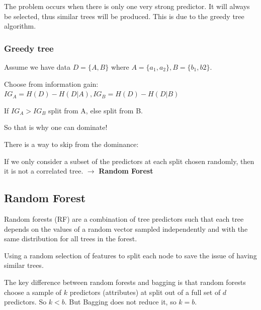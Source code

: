 \documentclass[letterpaper,12pt]{article}
\begin{document}
The problem occurs when there is only one very strong predictor. It will always be selected, thus similar trees will be produced. This is due to the greedy tree algorithm. 

\subsubsection{Greedy tree}
Assume we have data $D=\{A,B\}$ where $A=\{a_1,a_2\},B=\{b_1,b2\}$.

Choose from information gain: $IG_A = H(D)-H(D|A), IG_B=H(D)-H(D|B)$

If $IG_A>IG_B$ split from A, else split from B. 

So that is why one can dominate!


There is a way to skip from the dominance: 

If we only consider a subset of the predictors at each split chosen randomly, then it is not a correlated tree. $\to$ \textbf{Random Forest}

\subsection{Random Forest}

Random forests (RF) are a combination of tree predictors such that each tree depends on the values of a random vector sampled independently and with the same distribution for all trees in the forest. 

Using a random selection of features to split each node to save the issue of having similar trees.

The key difference between random forests and bagging is that random forests choose a sample of $k$ predictors (attributes) at split out of a full set of $d$ predictors. So $k<b$. But Bagging does not reduce it, so $k=b$.
\end{document}
